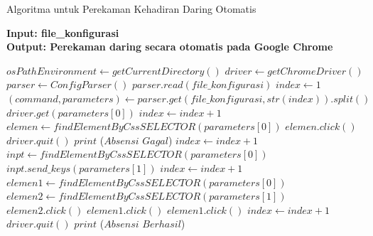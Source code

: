 \begin{algorithm} 
	\caption{Algoritma untuk Perekaman Kehadiran Daring  Otomatis}\label{euclid}
	\hspace*{\algorithmicindent} \textbf{Input: file\_konfigurasi} \\
	\hspace*{\algorithmicindent} \textbf{Output: Perekaman daring secara otomatis pada Google Chrome} 
	\begin{algorithmic}[1]
	\State $osPathEnvironment \gets getCurrentDirectory()$
	\State $driver \gets getChromeDriver()$ 
	\State $parser \gets ConfigParser()$
	\State $parser.read(file\_konfigurasi)$
	\State $index \gets 1$
	\State $(command, parameters) \gets parser.get(file\_konfigurasi, str(index)).split()$
	\State $driver.get(parameters[0])$  
	\State $index \gets index + 1$
	\State $elemen \gets findElementByCssSELECTOR(parameters[0])$
	\State $elemen.click()$
	\Else 
	\State $driver.quit()$
	\State $print$ ($Absensi$ $Gagal$)
	\State $index \gets index + 1$
	\EndIf
	\State $inpt \gets findElementByCssSELECTOR(parameters[0])$
	\State $inpt.send\_keys(parameters[1])$
	\State $index \gets index + 1$
	\State $elemen1 \gets findElementByCssSELECTOR(parameters[0])$
	\State $elemen2 \gets findElementByCssSELECTOR(parameters[1])$
	\State $elemen2.click()$
	\State $elemen1.click()$
	\Else
	\State $elemen1.click()$
	\State $index \gets index + 1$
	\EndIf
	\State $driver.quit() $  
	\State $print$ ($Absensi$ $Berhasil$)
	\EndIf
	\EndWhile
	\end{algorithmic}
\end{algorithm}